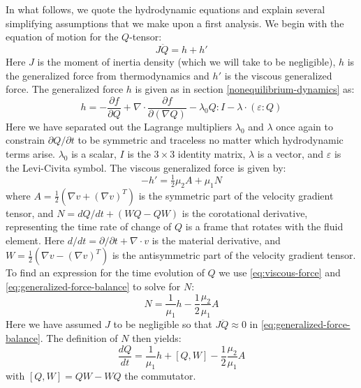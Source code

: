 \documentclass[reqno]{article}
\begin{document}
  In what follows, we quote the hydrodynamic equations and explain
  several simplifying assumptions that we make upon a first analysis.
  We begin with the equation of motion for the $Q$-tensor:
  \begin{equation} \label{eq:generalized-force-balance}
    J \ddot{Q} = h + h'
  \end{equation}
  Here $J$ is the moment of inertia density (which we will take to be
  negligible), $h$ is the generalized force from thermodynamics and $h'$ is the
  viscous generalized force.
  The generalized force $h$ is given as in section
  \ref{nonequilibrium-dynamics} as:
  \begin{equation}
    h
    =
    -\frac{\partial f}{\partial Q}
    + \nabla \cdot \frac{\partial f}{\partial (\nabla Q)}
    - \lambda_0 Q : I
    - \lambda \cdot \left( \varepsilon : Q \right)
  \end{equation}
  Here we have separated out the Lagrange multipliers $\lambda_0$ and $\lambda$
  once again to constrain $\partial Q/\partial t$ to be symmetric and traceless
  no matter which hydrodynamic terms arise.
  $\lambda_0$ is a scalar, $I$ is the $3\times 3$ identity matrix, $\lambda$ is
  a vector, and $\varepsilon$ is the Levi-Civita symbol.
  The viscous generalized force is given by:
  \begin{equation} \label{eq:viscous-force}
    -h'
    =
    \tfrac12 \mu_2 A
    + \mu_1 N
  \end{equation}
  where $A = \tfrac12 \left( \nabla v + \left( \nabla v \right)^T \right)$ is
  the symmetric part of the velocity gradient tensor, and $N = dQ / dt + (WQ -
  QW)$ is the corotational derivative, representing the time rate of change of
  $Q$ is a frame that rotates with the fluid element.
  Here $d/dt = \partial / \partial t + \nabla \cdot v$ is the material
  derivative, and $W = \tfrac12 \left( \nabla v - \left( \nabla v \right)^T
  \right)$ is the antisymmetric part of the velocity gradient tensor.
  To find an expression for the time evolution of $Q$ we use
  \eqref{eq:viscous-force} and \eqref{eq:generalized-force-balance} to
  solve for $N$:
  \begin{equation} \label{eq:N}
    N = \frac{1}{\mu_1} h - \frac12 \frac{\mu_2}{\mu_1} A
  \end{equation}
  Here we have assumed $J$ to be negligible so that $J\ddot{Q} \approx 0$ in
  \eqref{eq:generalized-force-balance}.
  The definition of $N$ then yields:
  \begin{equation} \label{eq:Q-equation}
    \frac{d Q}{dt}
    =
    \frac{1}{\mu_1} h
    + \left[ Q, W \right]
    - \frac12 \frac{\mu_2}{\mu_1} A
  \end{equation}
  with $\left[ Q, W \right] = QW - WQ$ the commutator.
\end{document}

